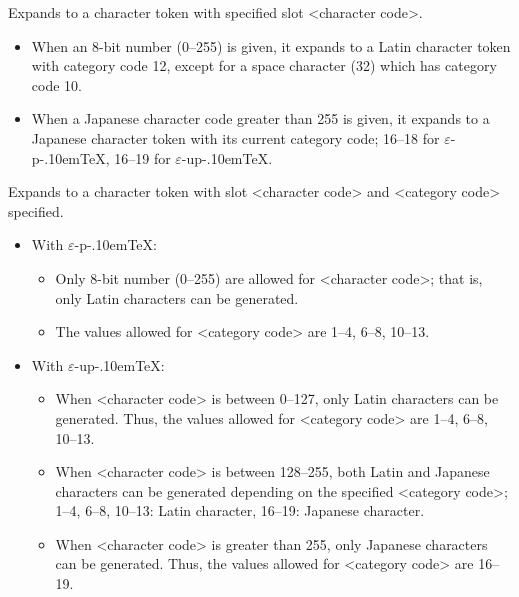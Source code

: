 \documentclass[a4paper,11pt]{article}
\def\epTeX{$\varepsilon$-\pTeX}\def\eTeX{$\varepsilon$-\TeX}
\def\eupTeX{$\varepsilon$-\upTeX}\def\upTeX{u\pTeX}
\def\pTeX{p\kern-.10em\TeX}
\begin{document}
\begin{simplelist}
  Expands to a character token with specified slot <character code>.
  \begin{itemize}
   \item When an 8-bit number (0--255) is given,
     it expands to a Latin character token with category code 12,
     except for a space character (32) which has category code 10.
   \item When a Japanese character code greater than 255 is given,
     it expands to a Japanese character token with its current category code;
     16--18 for \epTeX, 16--19 for \eupTeX.
  \end{itemize}

  Expands to a character token with slot <character code> and
  <category code> specified.
  \begin{itemize}
   \item With \epTeX:
     \begin{itemize}
      \item Only 8-bit number (0--255) are allowed for <character code>;
        that is, only Latin characters can be generated.
      \item The values allowed for <category code> are 1--4, 6--8, 10--13.
     \end{itemize}
   \item With \eupTeX:
     \begin{itemize}
      \item When <character code> is between 0--127,
        only Latin characters can be generated.
        Thus, the values allowed for <category code> are
        1--4, 6--8, 10--13.
      \item When <character code> is between 128--255,
        both Latin and Japanese characters can be generated
        depending on the specified <category code>;
        1--4, 6--8, 10--13: Latin character,
        16--19: Japanese character.
      \item When <character code> is greater than 255,
        only Japanese characters can be generated.
        Thus, the values allowed for <category code> are
        16--19.
     \end{itemize}
  \end{itemize}
\end{simplelist}
\end{document}
